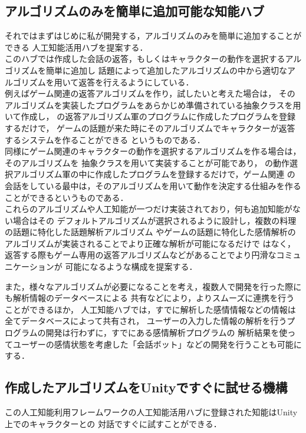 \subsection{アルゴリズムのみを簡単に追加可能な知能ハブ}
それではまずはじめに私が開発する，アルゴリズムのみを簡単に追加することができる
人工知能活用ハブを提案する．
\\
このハブでは作成した会話の返答，もしくはキャラクターの動作を選択するアルゴリズムを簡単に追加し
話題によって追加したアルゴリズムの中から適切なアルゴリズムを用いて返答を行えるようにしている．
\\
例えばゲーム関連の返答アルゴリズムを作り，試したいと考えた場合は，
そのアルゴリズムを実装したプログラムをあらかじめ準備されている抽象クラスを用いて作成し，
の返答アルゴリズム軍のプログラムに作成したプログラムを登録するだけで，
ゲームの話題が来た時にそのアルゴリズムでキャラクターが返答するシステムを作ることができる
というものである．
\\
同様にゲーム関連のキャラクターの動作を選択するアルゴリズムを作る場合は，そのアルゴリズムを
抽象クラスを用いて実装することが可能であり，
の動作選択アルゴリズム軍の中に作成したプログラムを登録するだけで，ゲーム関連
の会話をしている最中は，そのアルゴリズムを用いて動作を決定する仕組みを作ることができるというものである．
\\
これらのアルゴリズムや人工知能が一つだけ実装されており，何も追加知能がない場合はその
デフォルトアルゴリズムが選択されるように設計し，複数の料理の話題に特化した話題解析アルゴリズム
やゲームの話題に特化した感情解析のアルゴリズムが実装されることでより正確な解析が可能になるだけで
はなく，返答する際もゲーム専用の返答アルゴリズムなどがあることでより円滑なコミュニケーションが
可能になるような構成を提案する．

また，様々なアルゴリズムが必要になることを考え，複数人で開発を行った際にも解析情報のデータベースによる
共有などにより，よりスムーズに連携を行うことができるほか，
人工知能ハブでは，すでに解析した感情情報などの情報は全てデータベースによって共有され，
ユーザーの入力した情報の解析を行うプログラムの開発は行わずに，すでにある感情解析プログラムの
解析結果を使ってユーザーの感情状態を考慮した「会話ボット」などの開発を行うことも可能にする．\\
\subsection{作成したアルゴリズムをUnityですぐに試せる機構}
この人工知能利用フレームワークの人工知能活用ハブに登録された知能はUnity上でのキャラクターとの
対話ですぐに試すことができる．\\

